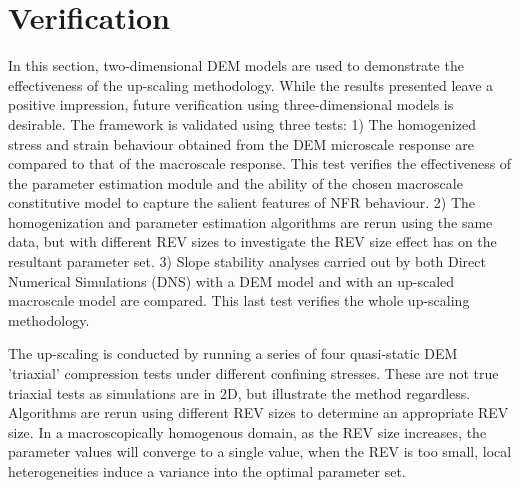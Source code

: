 \section{Verification}

In this section, two-dimensional DEM models are used to demonstrate the effectiveness of the up-scaling methodology. While the results presented leave a positive impression, future verification using three-dimensional models is desirable. The framework is validated using three tests: 1) The homogenized stress and strain behaviour obtained from the DEM microscale response are compared to that of the macroscale response. This test verifies the effectiveness of the parameter estimation module and the ability of the chosen macroscale constitutive model to capture the salient features of NFR behaviour. 2) The homogenization and parameter estimation algorithms are rerun using the same data, but with different REV sizes to investigate the REV size effect has on the resultant parameter set. 3) Slope stability analyses carried out by both Direct Numerical Simulations (DNS) with a DEM model and with an up-scaled macroscale model are compared. This last test verifies the whole up-scaling methodology.

The up-scaling is conducted by running a series of four quasi-static DEM 'triaxial' compression tests under different confining stresses. These are not true triaxial tests as simulations are in 2D, but illustrate the method regardless. Algorithms are rerun using different REV sizes to determine an appropriate REV size. In a macroscopically homogenous domain, as the REV size increases, the parameter values will converge to a single value, when the REV is too small, local heterogeneities induce a variance into the optimal parameter set.


